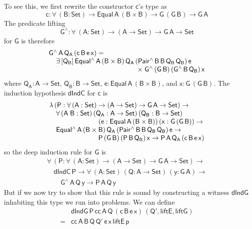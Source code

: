 \documentclass[sigplan,10pt]{acmart}
\begin{document}
To see this, we first rewrite the constructor $\mathsf{c}$'s type as
\[\mathsf{c : \forall\, (B : Set) \to Equal\,A\,(B \times B)
  \to G\,(G\,B) \to G\,A}\]
The predicate lifting
\[\mathsf{G^{\wedge} : \forall\, (A : Set) \to (A \to Set) \to G\,A \to
  Set}\] for $\mathsf{G}$ is therefore
\[\begin{array}{l}
\mathsf{G^{\wedge}\,A\,Q_A\,(c\,B\,e\,x) =}\\
\mathsf{\hspace*{0.15in}\exists\, [Q_B]\,
Equal^{\wedge}\,A\,(B \times
B)\,Q_A\,(Pair^{\wedge}\,B\,B\,Q_B\,Q_B)\,e}\\
\mathsf{\hspace*{1.8in}\times \;G^{\wedge}\,(G\,B)\,(G^{\wedge}\,B\,Q_B)\,x}
\end{array}\]
where $\mathsf{Q_A : A \to Set}$, $\mathsf{Q_B : B \to Set}$, $\mathsf{e
  : Equal\,A\,(B \times B)}$, and $\mathsf{x : G\,(G\,B)}$.
The induction hypothesis $\mathsf{dIndC}$ for $\mathsf{c}$ is
\[\begin{array}{l}
\mathsf{\lambda\, (P : \forall\, (A : Set) \to (A \to Set) \to G\,A
  \to Set)\to} \\ 
\quad\mathsf{ \forall\, (A\;B : Set)\, (Q_A : A \to Set)\, (Q_B : B
  \to Set)}\\
\hspace*{1in}\mathsf{(e : Equal\,A\,(B \times B))\, (x : G\,(G\,B))\to} \\ 
\quad\mathsf{Equal^{\wedge}\,A\,(B \times
  B)\,Q_A\,(Pair^{\wedge}\,B\,B\,Q_B\,Q_B)\,e \to}\\
\hspace*{1in}\mathsf{P\,(G\,B)\,(P\,B\,Q_B)\,x 
	\to P\,A\,Q_A\,(c\,B\, e\,x)} 
\end{array}\]
so the deep induction rule for $\mathsf{G}$ is
\[\begin{array}{l}
\mathsf{\forall\, (P : \forall\, (A : Set) \to (A \to Set) \to G\,A \to Set)
  \to}\\
\quad\mathsf{dIndC\,P \to \forall\, (A : Set)\, (Q : A \to Set)\, (y : G\,A)
  \to}\\
\quad\quad\mathsf{G^{\wedge}\,A\,Q\,y \to P\,A\,Q\,y}
\end{array}\] But if we now try to show
that this rule is sound by constructing a witness $\mathsf{dIndG}$
inhabiting this type we run into problems. We can define
\[\begin{array}{ll}
  & \mathsf{dIndG\,P\,cc\,A\,Q\,(c\,B\,e\,x)\,(Q', liftE, liftG)}\\
= & \mathsf{cc\,A\,B\,Q\,Q'\,e\,x\,liftE\,p}
\end{array}\]
\end{document}
